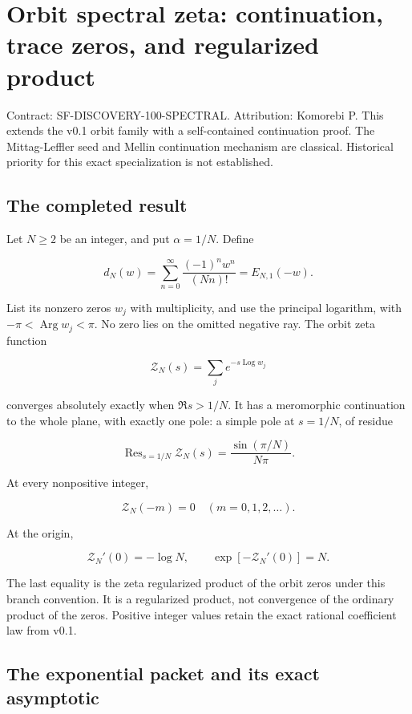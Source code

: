 \hypertarget{orbit-spectral-zeta-continuation-trace-zeros-and-regularized-product}{%
\section{Orbit spectral zeta: continuation, trace zeros, and regularized
product}\label{orbit-spectral-zeta-continuation-trace-zeros-and-regularized-product}}

Contract: SF-DISCOVERY-100-SPECTRAL. Attribution: Komorebi P. This
extends the v0.1 orbit family with a self-contained continuation proof.
The Mittag-Leffler seed and Mellin continuation mechanism are classical.
Historical priority for this exact specialization is not established.

\hypertarget{the-completed-result}{%
\subsection{The completed result}\label{the-completed-result}}

Let \(N\ge2\) be an integer, and put \(\alpha=1/N\). Define

\[
d_N(w)=\sum_{n=0}^{\infty}\frac{(-1)^n w^n}{(Nn)!}
      =E_{N,1}(-w).
\]

List its nonzero zeros \(w_j\) with multiplicity, and use the principal
logarithm, with \(-\pi<\operatorname{Arg}w_j<\pi\). No zero lies on the
omitted negative ray. The orbit zeta function

\[
\mathcal Z_N(s)=\sum_j e^{-s\operatorname{Log}w_j}
\]

converges absolutely exactly when \(\Re s>1/N\). It has a meromorphic
continuation to the whole plane, with exactly one pole: a simple pole at
\(s=1/N\), of residue

\[
\boxed{\operatorname{Res}_{s=1/N}\mathcal Z_N(s)
      =\frac{\sin(\pi/N)}{N\pi}.}
\]

At every nonpositive integer,

\[
\boxed{\mathcal Z_N(-m)=0\quad(m=0,1,2,\ldots).}
\]

At the origin,

\[
\boxed{\mathcal Z_N'(0)=-\log N,\qquad
       \exp[-\mathcal Z_N'(0)]=N.}
\]

The last equality is the zeta regularized product of the orbit zeros
under this branch convention. It is a regularized product, not
convergence of the ordinary product of the zeros. Positive integer
values retain the exact rational coefficient law from v0.1.

\hypertarget{the-exponential-packet-and-its-exact-asymptotic}{%
\subsection{The exponential packet and its exact
asymptotic}\label{the-exponential-packet-and-its-exact-asymptotic}}

